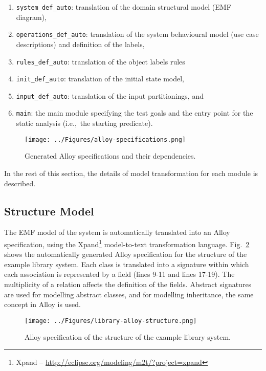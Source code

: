 \begin{enumerate}
	\item \texttt{system\_def\_auto}: translation of the domain structural model (EMF diagram),
	\item \texttt{operations\_def\_auto}: translation of the system behavioural model (use case descriptions) and definition of the labels,
	\item \texttt{rules\_def\_auto}: translation of the object labels rules
	\item \texttt{init\_def\_auto}: translation of the initial state model, 
	\item \texttt{input\_def\_auto}: translation of the input partitionings, and
	\item \texttt{main}: the main module specifying the test goals and the entry point for the static analysis (i.e.,\ the starting predicate).
\end{enumerate}

\begin{figure}[h]
\centering
\texttt{[image: ../Figures/alloy-specifications.png]}
\caption{Generated Alloy specifications and their dependencies.}
\label{fig:alloy-specifications}
\end{figure}

In the rest of this section, the details of model transformation for each module is described.

\subsection{Structure Model}
\label{sec:alloy-structure}
The EMF model of the system is automatically translated into an Alloy specification, using the Xpand\footnote{Xpand – \url{http://eclipse.org/modeling/m2t/?project=xpand}} model-to-text transformation language. Fig.~\ref{fig:library-alloy-structure} shows the automatically generated Alloy specification for the structure of the example library system. Each class is translated into a signature within which each association is represented by a field (lines 9-11 and lines 17-19). The multiplicity of a relation affects the definition of the fields. Abstract signatures are used for modelling abstract classes, and for modelling inheritance, the same concept in Alloy is used.

\begin{figure}[h]
\centering
\texttt{[image: ../Figures/library-alloy-structure.png]}
\caption{Alloy specification of the structure of the example library system.}
\label{fig:library-alloy-structure}
\end{figure}

